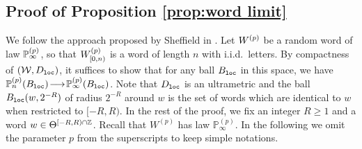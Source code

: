 \documentclass[a4paper]{article}
\newcommand*{\W}{\mathcal{W}}
\begin{document}
\subsection{Proof of Proposition \ref{prop:word limit}}

We follow the approach proposed by Sheffield in \cite[Section 4.2]{She11}. Let $W^{(p)}$ be a random word of law $\mathbb{P}^{(p)}_\infty$, so that $W_{[0,n)}^{(p)}$ is a word of length $n$ with i.i.d.\ letters.
By compactness of $(\W,D\sub{loc})$, it suffices to show that for any ball $B_{\mathtt{loc}}$ in this space, we have $\mathbb{P}^{(p)}_n(B_{\mathtt{loc}}) \!\longrightarrow \!
				\mathbb{P}^{(p)}_\infty (B_{\mathtt{loc}})$.
Note that $D_{\mathtt{loc}}$ is an ultrametric and 
the ball $B_{\mathtt{loc}}(w,2^{-R})$ of radius $2^{-R}$ around $w$ is the set of words which are identical to $w$ when restricted to $[-R,R)$.	
In the rest of the proof, we fix an integer $R\geq 1$ and a word $w\in\Theta^{[-R,R)\cap \mathbb{Z}}$.
Recall that $W^{(p)}$ has law $ \mathbb{P}_{\infty}^{(p)}$.
In the following we omit the parameter $p$ from the superscripts to keep simple notations.
\end{document}
